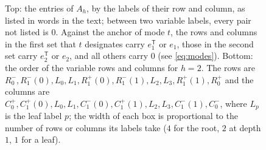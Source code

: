 \documentclass{article}
\theoremstyle{plain}
\theoremstyle{definition}
\begin{document}
\begin{figure}[htbp]
\vspace{0.8em}


\caption{\label{fig:map}%
Top: the entries of $A_h$, by the labels of their row and column, as listed in
words in the text; between two variable labels, every pair not listed is $0$.
Against the anchor of mode $t$, the rows and columns in the first set that $t$
designates carry $e_1^{\mathsf T}$ or $e_1$, those in the second set carry
$e_2^{\mathsf T}$ or $e_2$, and all others carry $0$ (see \eqref{eq:modes}).
Bottom: the order of the variable rows and columns for $h=2$. The rows are
$R_0^-, R_1^-(0), L_0, L_1, R_1^+(0), R_1^-(1), L_2, L_3, R_1^+(1), R_0^+$ and
the columns are $C_0^+, C_1^+(0), L_0, L_1, C_1^-(0), C_1^+(1), L_2, L_3,
C_1^-(1), C_0^-$, where $L_p$ is the leaf label $p$; the width of each box is
proportional to the number of rows or columns its labels take ($4$ for the
root, $2$ at depth $1$, $1$ for a leaf).}
\end{figure}
\end{document}
